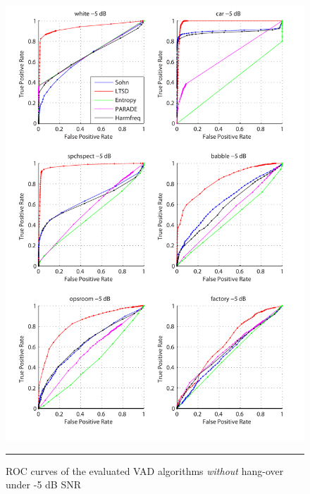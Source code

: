 \begin{figure}[htbp]
	\centering
		\includegraphics[width=1.0\columnwidth]{Figures/Chapter4/-5dBnoh.pdf}
		\rule{37em}{0.5pt}
	\caption[ROC curves of the evaluated algorithms \emph{without} hang-over under -5 dB SNR]{ROC curves of the evaluated VAD algorithms \emph{without} hang-over under -5 dB SNR}
	\label{fig:-5dBnoh}
\end{figure}

